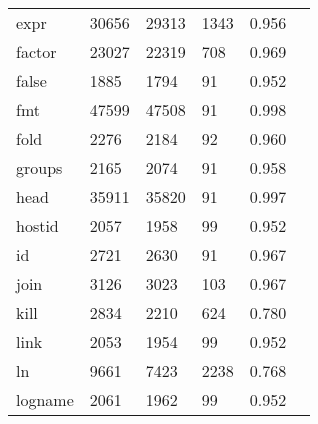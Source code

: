 \begin{longtable}{lp{2.4cm}p{2.4cm}p{2.4cm}p{2.4cm}p{2.4cm}}
expr      &                                   30656 &                       29313 &                         1343 &                                   0.956 \\
factor    &                                   23027 &                       22319 &                          708 &                                   0.969 \\
false     &                                    1885 &                        1794 &                           91 &                                   0.952 \\
fmt       &                                   47599 &                       47508 &                           91 &                                   0.998 \\
fold      &                                    2276 &                        2184 &                           92 &                                   0.960 \\
groups    &                                    2165 &                        2074 &                           91 &                                   0.958 \\
head      &                                   35911 &                       35820 &                           91 &                                   0.997 \\
hostid    &                                    2057 &                        1958 &                           99 &                                   0.952 \\
id        &                                    2721 &                        2630 &                           91 &                                   0.967 \\
join      &                                    3126 &                        3023 &                          103 &                                   0.967 \\
kill      &                                    2834 &                        2210 &                          624 &                                   0.780 \\
link      &                                    2053 &                        1954 &                           99 &                                   0.952 \\
ln        &                                    9661 &                        7423 &                         2238 &                                   0.768 \\
logname   &                                    2061 &                        1962 &                           99 &                                   0.952 \\

\end{longtable}
